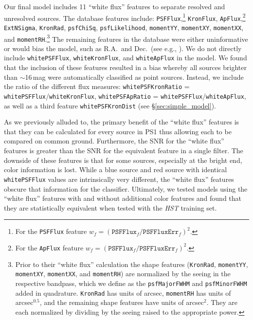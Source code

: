 \documentclass[twocolumn, dvipdfmx]{aastex62}
\begin{document}
\begin{CJK*}{UTF8}{gbsn}
Our final model includes 11 ``white flux'' features to separate resolved and unresolved sources. The database features include: \texttt{PSFFlux},\footnote{For the
\texttt{PSFFlux} feature $w_f =
(\mathtt{PSFFlux}_f/\mathtt{PSFFluxErr}_f)^2$.} \texttt{KronFlux},
\texttt{ApFlux},\footnote{For the \texttt{ApFlux} feature $w_f =
(\mathtt{PSFFlux}_f/\mathtt{PSFFluxErr}_f)^2$.} 
\texttt{ExtNSigma},
\texttt{KronRad}, \texttt{psfChiSq}, \texttt{psfLikelihood},
\texttt{momentYY}, \texttt{momentXY}, \texttt{momentXX}, and
\texttt{momentRH}.\footnote{Prior to their ``white flux'' calculation the
shape features (\texttt{KronRad}, \texttt{momentYY}, \texttt{momentXY},
\texttt{momentXX}, and \texttt{momentRH}) are normalized by the seeing in the
respective bandpass, which we define as the \texttt{psfMajorFWHM} and
\texttt{psfMinorFWHM} added in quadrature. \texttt{KronRad} has units of
arcsec, \texttt{momentRH} has units of arcsec$^{0.5}$, and the remaining
shape features have units of arcsec$^{2}$. They are each normalized by
dividing by the seeing raised to the appropriate power. } The remaining
features in the database were either uninformative or would bias the model,
such as R.A.\ and Dec.\ (see e.g., \citealt{Richards12a}). We do not directly
include \texttt{whitePSFFlux}, \texttt{whiteKronFlux}, and
\texttt{whiteApFlux} in the model. We found that the inclusion of these
features resulted in a bias whereby all sources brighter than $\sim$16\,mag
were automatically classified as point sources. Instead, we include the ratio of the
different flux measures: \texttt{whitePSFKronRatio} =
\texttt{whitePSFFlux}/\texttt{whiteKronFlux}, \texttt{whitePSFApRatio} =
\texttt{whitePSFFlux}/\texttt{whiteApFlux}, as well as a third feature
\texttt{whitePSFKronDist} (see \S\ref{sec:simple_model}).

As we previously alluded to, the primary benefit of the ``white flux''
features is that they can be calculated for every source in PS1 thus
allowing each to be compared on common ground. Furthermore, the SNR for the
``white flux'' features is greater than the SNR for the equivalent feature
in a single filter. The downside of these features is that for some sources,
especially at the bright end, color information is lost. While a blue source
and red source with identical \texttt{whitePSFFlux} values are intrinsically
very different, the ``white flux'' features obscure that information for the
classifier. Ultimately, we tested models using the ``white flux'' features
with and without additional color features and found that they are
statistically equivalent when tested with the \textit{HST} training set.


\end{CJK*}
\end{document}
